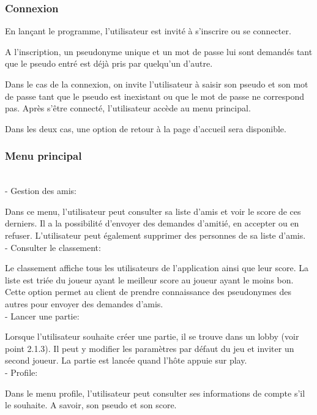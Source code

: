 \documentclass[a4paper,12pt]{article}
\begin{document}
\subsubsection{Connexion}
En lançant le programme, l'utilisateur est invité à s'inscrire ou se connecter.

A l'inscription, un pseudonyme unique et un mot de passe lui sont demandés tant que le pseudo entré est déjà pris par quelqu'un d'autre.

Dans le cas de la connexion, on invite l'utilisateur à saisir son pseudo et son mot de passe tant que le pseudo est inexistant ou que le mot de passe ne correspond pas. Après s’être connecté, l'utilisateur accède au menu principal.

Dans les deux cas, une option de retour à la page d'accueil sera disponible.

\subsubsection{Menu principal}

\\- Gestion des amis:

Dans ce menu, l'utilisateur peut consulter sa liste d'amis et voir le score de ces derniers. Il a la possibilité d'envoyer 
des demandes d'amitié, en accepter ou en refuser. L'utilisateur peut également supprimer des personnes de sa liste d'amis.\\

- Consulter le classement:

Le classement affiche tous les utilisateurs de l'application ainsi que leur score. La liste est triée du joueur ayant le meilleur score au joueur ayant le moins bon.  
Cette option permet au client de prendre connaissance des pseudonymes des autres pour envoyer des demandes d'amis.\\

- Lancer une partie:

Lorsque l'utilisateur souhaite créer une partie, il se trouve dans un lobby (voir point 2.1.3). Il peut y modifier les paramètres par défaut du jeu et inviter un second joueur.
La partie est lancée quand l'hôte appuie sur play.\\

- Profile:

Dans le menu profile, l'utilisateur peut consulter ses informations de compte s'il le souhaite. A savoir, son pseudo et son score.
\end{document}
